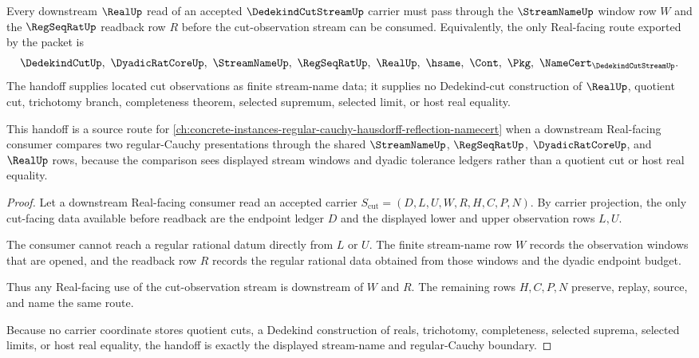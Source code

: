 \begin{theorem}\label{thm:dedekind-cut-stream-regular-cauchy-handoff}
Every downstream $\RealUp$ read of an accepted $\DedekindCutStreamUp$ carrier must pass through the $\StreamNameUp$ window row $W$ and the $\RegSeqRatUp$ readback row $R$ before the cut-observation stream can be consumed. Equivalently, the only Real-facing route exported by the packet is
$$
\DedekindCutUp,\ \DyadicRatCoreUp,\ \StreamNameUp,\ \RegSeqRatUp,\ \RealUp,\ \hsame,\ \Cont,\ \Pkg,\ \NameCert_{\DedekindCutStreamUp}.
$$
The handoff supplies located cut observations as finite stream-name data; it supplies no Dedekind-cut construction of $\RealUp$, quotient cut, trichotomy branch, completeness theorem, selected supremum, selected limit, or host real equality.
\end{theorem}
This handoff is a source route for \autoref{ch:concrete-instances-regular-cauchy-hausdorff-reflection-namecert} when a downstream Real-facing consumer compares two regular-Cauchy presentations through the shared $\StreamNameUp$, $\RegSeqRatUp$, $\DyadicRatCoreUp$, and $\RealUp$ rows, because the comparison sees displayed stream windows and dyadic tolerance ledgers rather than a quotient cut or host real equality.
\begin{proof}
Let a downstream Real-facing consumer read an accepted carrier $S_{\mathrm{cut}}=(D,L,U,W,R,H,C,P,N)$. By carrier projection, the only cut-facing data available before readback are the endpoint ledger $D$ and the displayed lower and upper observation rows $L,U$.

The consumer cannot reach a regular rational datum directly from $L$ or $U$. The finite stream-name row $W$ records the observation windows that are opened, and the readback row $R$ records the regular rational data obtained from those windows and the dyadic endpoint budget.

Thus any Real-facing use of the cut-observation stream is downstream of $W$ and $R$. The remaining rows $H,C,P,N$ preserve, replay, source, and name the same route.

Because no carrier coordinate stores quotient cuts, a Dedekind construction of reals, trichotomy, completeness, selected suprema, selected limits, or host real equality, the handoff is exactly the displayed stream-name and regular-Cauchy boundary.
\end{proof}


